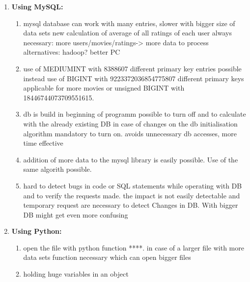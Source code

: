 \documentclass[a4paper,10pt,twoside]{article}
\begin{document}
\begin{enumerate}
	\item \textbf{Using MySQL:} \\
	\begin{enumerate}
		\item 	
		mysql database can work with many entries, slower with bigger size of data sets
		new calculation of average of all ratings of each user always necessary: more users/movies/ratings-> more data to process
		alternatives: hadoop? better PC
		
		\item use of MEDIUMINT with 	8388607 different primary key entries possible
		instead use of BIGINT with 9223372036854775807 different primary keys applicable for more movies
		or unsigned BIGINT with 18446744073709551615.
		
		\item db is build in beginning of programm
		possible to turn off and to calculate with the already existing DB
		in case of changes on the db initialisation algorithm mandatory to turn on.
		avoids unnecessary db accesses, more time effective
		
		\item addition of more data to the mysql library is easily possible. Use of the same algorith possible.
		
		\item hard to detect bugs in code or SQL statements while operating with DB and to verify the requests made. the impact is not easily detectable and temporary request are necessary to detect Changes in DB. With bigger DB might get even more confusing
	\end{enumerate}	
	
	
	\item \textbf{Using Python:} \\
	\begin{enumerate}
		\item 	open the file with python function ****. 
		in case of a larger file with more data sets function necessary which can open bigger files
	
		\item holding huge variables in an object 
	
	
	\end{enumerate}		

	
\end{enumerate}



 
\end{document}
